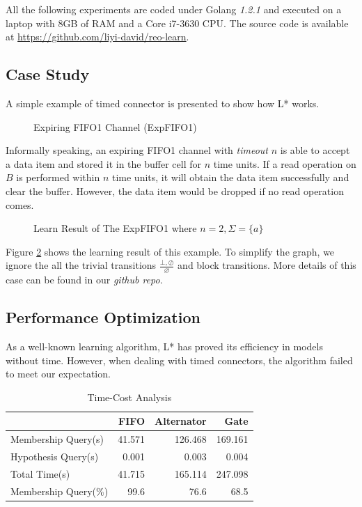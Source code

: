 \documentclass[conference, a4paper]{IEEEtran}
\newcommand{\rnoread}[0]{\oslash}
\newcommand{\rempty}[0]{\varnothing}
\begin{document}
All the following experiments are coded under Golang \emph{1.2.1} and executed on a laptop with 8GB
of RAM and a Core i7-3630 CPU. The source code is available at
\url{https://github.com/liyi-david/reo-learn}.

\subsection{Case Study}
A simple example of timed connector is presented to show how L* works.
\begin{figure}[ht]
  \begin{center}
    
  \end{center}
  \caption{Expiring FIFO1 Channel (ExpFIFO1)}
  \label{fig:expfifo}
\end{figure}

Informally speaking, an expiring FIFO1 channel with \emph{timeout} $n$ is able to accept a data item
and stored it in the buffer cell for $n$ time units. If a read operation on $B$ is performed within
$n$ time units, it will obtain the data item successfully and clear the buffer. However, the data
item would be dropped if no read operation comes.

\begin{figure}[ht]
  \begin{center}
    
  \end{center}
  \caption{Learn Result of The ExpFIFO1 where $n=2,\Sigma=\{a\}$}
  \label{fig:expfifosemantics}
\end{figure}

Figure \ref{fig:expfifosemantics} shows the learning result of this example.
To simplify the graph, we ignore the all the trivial transitions $\frac{\bot,\rnoread}{\rempty}$
and block transitions. More details of this case can be found in our \emph{github repo}.

\subsection{Performance Optimization}
As a well-known learning algorithm, L* has proved its efficiency in models without time.
However, when dealing with timed connectors, the algorithm failed to meet our expectation.

\begin{table}[ht]
  \renewcommand{\arraystretch}{1.3}
  \caption{Time-Cost Analysis}
  \label{tabel:timecost}
  \centering
  \begin{tabular}{l||rrr}
    \hline
    & FIFO & Alternator & Gate \\
    \hline\hline
    Membership Query(s) & 41.571 & 126.468 & 169.161 \\
    Hypothesis Query(s) & 0.001 & 0.003 & 0.004 \\
    Total Time(s) & 41.715 & 165.114 & 247.098 \\
    Membership Query(\%) & 99.6 & 76.6 & 68.5 \\
    \hline
  \end{tabular}
\end{table}
\end{document}
